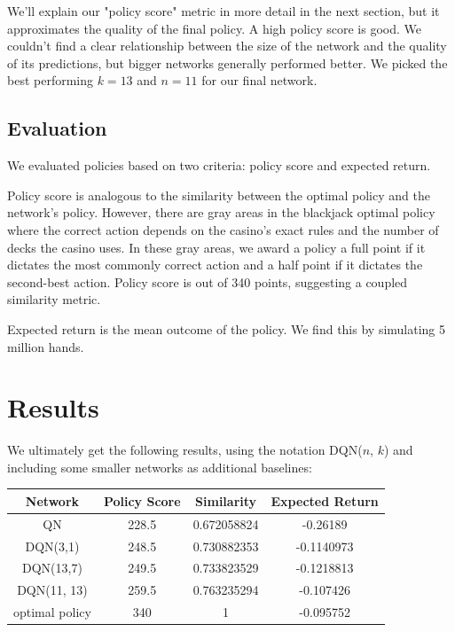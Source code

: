 \documentclass{article}
\begin{document}
We'll explain our "policy score" metric in more detail in the next section, but it approximates the quality of the final policy. A high policy score is good. We couldn't find a clear relationship between the size of the network and the quality of its predictions, but bigger networks generally performed better. We picked the best performing $k = 13$ and $n = 11$ for our final network.  

\subsection{Evaluation}

We evaluated policies based on two criteria: policy score and expected return.

Policy score is analogous to the similarity between the optimal policy and the network's policy. However, there are gray areas in the blackjack optimal policy where the correct action depends on the casino's exact rules and the number of decks the casino uses. In these gray areas, we award a policy a full point if it dictates the most commonly correct action and a half point if it dictates the second-best action. Policy score is out of 340 points, suggesting a coupled similarity metric. 

Expected return is the mean outcome of the policy. We find this by simulating 5 million hands.  

\section{Results}

We ultimately get the following results, using the notation DQN($n$, $k$) and including some smaller networks as additional baselines: 

\FloatBarrier
\begin{center}
	\begin{tabular}{ c|c|c|c } 
		
		Network & Policy Score & Similarity & Expected Return \\ 
		\hline
		QN & 228.5 & 0.672058824 & -0.26189 \\ 
		DQN(3,1) & 248.5 & 0.730882353 & -0.1140973 \\ 
		DQN(13,7) & 249.5 & 0.733823529 & -0.1218813 \\ 
		DQN(11, 13) & 259.5 & 0.763235294 & -0.107426 \\ 
		optimal policy & 340 & 1 & -0.095752 \\ 
	\end{tabular}
\end{center}
\FloatBarrier
\end{document}
